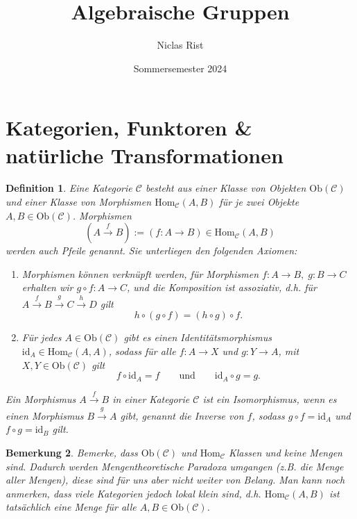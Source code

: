 \documentclass[a4paper, 11pt]{scrartcl}
\title{Algebraische Gruppen}
\author{Niclas Rist}
\date{Sommersemester 2024}
\newcommand{\Hom}{\text{Hom}}
\newcommand{\id}{\text{id}}
\newcommand{\Ob}{\text{Ob}}
\theoremstyle{basicstyle}
\newtheorem{definition}{Definition}[section]
\newtheorem{bemerkung}[definition]{Bemerkung}
\begin{document}
    \maketitle
    \onehalfspacing

    \section{Kategorien, Funktoren \& natürliche Transformationen}

    \begin{definition}
        Eine \emph{Kategorie} \(\mathcal{C}\) besteht aus einer Klasse von \emph{Objekten} \(\Ob(\mathcal{C})\) und einer Klasse von \emph{Morphismen} \(\Hom_{\mathcal{C}}(A, B)\) für je zwei Objekte \(A, B \in \Ob(\mathcal{C})\).
        Morphismen
        \[(A \overset{f}{\longrightarrow} B) := (f: A \longrightarrow B) \in \Hom_{\mathcal{C}}(A, B)\]
        werden auch \emph{Pfeile} genannt.
        Sie unterliegen den folgenden Axiomen:
        \begin{enumerate}
            \item Morphismen können \emph{verknüpft} werden, für Morphismen \(f: A \to B, \; g: B \to C\) erhalten wir \(g \circ f: A \to C\), und die Komposition ist assoziativ, d.h. für \(A \overset{f}{\longrightarrow} B \overset{g}{\longrightarrow} C \overset{h}{\longrightarrow} D\) gilt
                \[h \circ (g \circ f) = (h \circ g) \circ f.\]
            \item Für jedes \(A \in \Ob(\mathcal{C})\) gibt es einen \emph{Identitätsmorphismus} \(\id_A \in \Hom_{\mathcal{C}}(A, A)\), sodass für alle \(f: A \to X\) und \(g: Y \to A\), mit \(X, Y \in \Ob(\mathcal{C})\) gilt
                \[f \circ \id_A = f \qquad\text{und}\qquad \id_A \circ g = g.\]
        \end{enumerate}
        Ein Morphismus \(A \overset{f}{\longrightarrow} B\) in einer Kategorie \(\mathcal{C}\) ist ein \emph{Isomorphismus}, wenn es einen Morphismus \(B \overset{g}{\longrightarrow} A\) gibt, genannt die \emph{Inverse} von \(f\), sodass \(g \circ f = \id_A\) und \(f \circ g = \id_B\) gilt.
    \end{definition}

    \begin{bemerkung}
        Bemerke, dass \(\Ob(\mathcal{C})\) und \(\Hom_{\mathcal{C}}\) Klassen und keine Mengen sind.
        Dadurch werden Mengentheoretische Paradoxa umgangen (z.B. die Menge aller Mengen), diese sind für uns aber nicht weiter von Belang.
        Man kann noch anmerken, dass viele Kategorien jedoch \emph{lokal klein} sind, d.h. \(\Hom_{\mathcal{C}}(A, B)\) ist tatsächlich eine Menge für alle \(A, B \in \Ob(\mathcal{C})\).
    \end{bemerkung}
\end{document}
